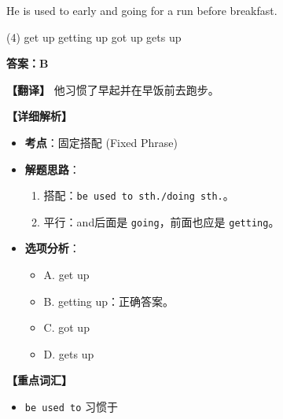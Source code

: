 \documentclass[11pt, a4paper]{article}
\newcommand{\analysis}[4]{
    \begin{solutionbox}
        \textbf{答案：#1}
        
        \textbf{【翻译】} #2
        
        \textbf{【详细解析】}
        #3
        
        \textbf{【重点词汇】}
        #4
    \end{solutionbox}
}
\newcommand{\blank}{\underline{\hspace{1.5cm}}}
\begin{document}
\begin{questions}
    \item He is used to \blank early and going for a run before breakfast.
    \begin{tasks}(4)
        \task get up \task getting up \task got up \task gets up
    \end{tasks}
    \analysis{B}{他习惯了早起并在早饭前去跑步。}{
        \begin{itemize}
            \item \textbf{考点}：固定搭配 (Fixed Phrase)
            \item \textbf{解题思路}：
                \begin{enumerate}
                    \item 搭配：\texttt{be used to sth./doing sth.}。
                    \item 平行：and后面是 \texttt{going}，前面也应是 \texttt{getting}。
                \end{enumerate}
            \item \textbf{选项分析}：
                \begin{itemize}
                    \item A. get up
                    \item B. getting up：正确答案。
                    \item C. got up
                    \item D. gets up
                \end{itemize}
        \end{itemize}
    }{
        \begin{itemize}
            \item \texttt{be used to} 习惯于
        \end{itemize}
    }
\end{questions}

\end{document}
